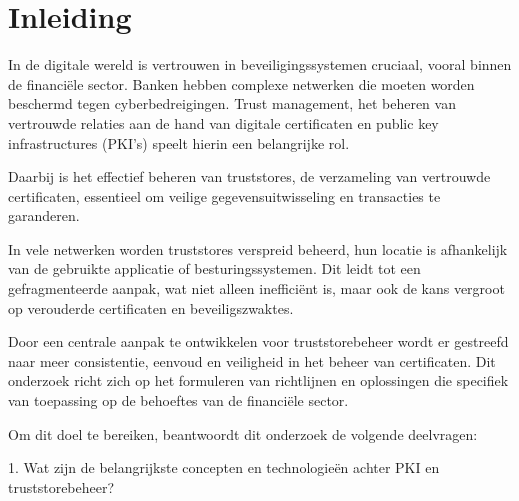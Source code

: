 


% 

\section{Inleiding}%
\label{sec:inleiding}

In de digitale wereld is vertrouwen in beveiligingssystemen cruciaal, vooral binnen de financiële sector. Banken hebben complexe netwerken die moeten worden beschermd tegen cyberbedreigingen. Trust management, het beheren van vertrouwde relaties aan de hand van digitale certificaten en public key infrastructures (PKI's) speelt hierin een belangrijke rol.

Daarbij is het effectief beheren van truststores, de verzameling van vertrouwde certificaten, essentieel om veilige gegevensuitwisseling en transacties te garanderen.

In vele netwerken worden truststores verspreid beheerd, hun locatie is afhankelijk van de gebruikte applicatie of besturingssystemen. Dit leidt tot een gefragmenteerde aanpak, wat niet alleen inefficiënt is, maar ook de kans vergroot op verouderde certificaten en beveiligszwaktes.

Door een centrale aanpak te ontwikkelen voor truststorebeheer wordt er gestreefd naar meer consistentie, eenvoud en veiligheid in het beheer van certificaten. Dit onderzoek richt zich op het formuleren van richtlijnen en oplossingen die specifiek van toepassing op de behoeftes van de financiële sector.

Om dit doel te bereiken, beantwoordt dit onderzoek de volgende deelvragen:

1. Wat zijn de belangrijkste concepten en technologieën achter PKI en truststorebeheer?

